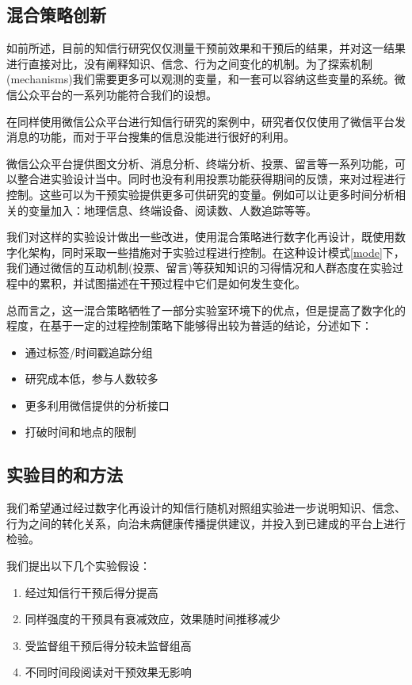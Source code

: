 \subsection{混合策略创新}
如前所述，目前的知信行研究仅仅测量干预前效果和干预后的结果，并对这一结果进行直接对比，没有阐释知识、信念、行为之间变化的机制。为了探索机制(mechanisms)我们需要更多可以观测的变量，和一套可以容纳这些变量的系统。微信公众平台的一系列功能符合我们的设想。

在同样使用微信公众平台进行知信行研究的案例中，研究者仅仅使用了微信平台发消息的功能，而对于平台搜集的信息没能进行很好的利用。

微信公众平台提供图文分析、消息分析、终端分析、投票、留言等一系列功能，可以整合进实验设计当中。同时也没有利用投票功能获得期间的反馈，来对过程进行控制。这些可以为干预实验提供更多可供研究的变量。例如可以让更多时间分析相关的变量加入：地理信息、终端设备、阅读数、人数追踪等等。

我们对这样的实验设计做出一些改进，使用混合策略进行数字化再设计，既使用数字化架构，同时采取一些措施对于实验过程进行控制。在这种设计模式\ref{mode}下，我们通过微信的互动机制(投票、留言)等获知知识的习得情况和人群态度在实验过程中的累积，并试图描述在干预过程中它们是如何发生变化。

总而言之，这一混合策略牺牲了一部分实验室环境下的优点，但是提高了数字化的程度，在基于一定的过程控制策略下能够得出较为普适的结论，分述如下：
\begin{itemize}
    \item 通过标签/时间戳追踪分组
    \item 研究成本低，参与人数较多
    \item 更多利用微信提供的分析接口
    \item 打破时间和地点的限制
\end{itemize}
\subsection{实验目的和方法}
我们希望通过经过数字化再设计的知信行随机对照组实验进一步说明知识、信念、行为之间的转化关系，向治未病健康传播提供建议，并投入到已建成的平台上进行检验。

我们提出以下几个实验假设：
\begin{enumerate}
    \item 经过知信行干预后得分提高
    \item 同样强度的干预具有衰减效应，效果随时间推移减少
    \item 受监督组干预后得分较未监督组高
    \item 不同时间段阅读对干预效果无影响
\end{enumerate}

